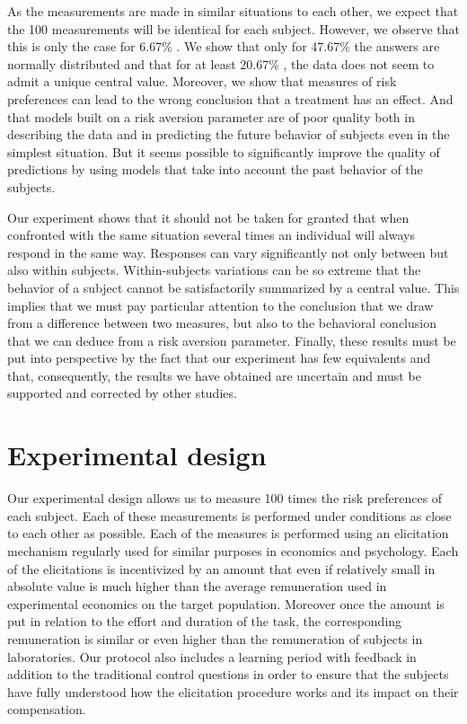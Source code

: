 \documentclass[
]{book}
\begin{document}
As the measurements are made in similar situations to each other, we
expect that the 100 measurements will be identical for each subject.
However, we observe that this is only the case for
6.67\% . We show that only for
47.67\% the answers are
normally distributed and that for at least
20.67\% , the data does
not seem to admit a unique central value. Moreover, we show that
measures of risk preferences can lead to the wrong conclusion that a
treatment has an effect.
And that models built on a risk aversion
parameter are of poor quality both in describing the data and in
predicting the future behavior of subjects even in the simplest
situation.
But it seems possible to significantly improve the quality of
predictions by using models that take into account the past behavior of
the subjects.

Our experiment shows that it should not be taken for granted that when
confronted with the same situation several times an individual will
always respond in the same way.
Responses can vary significantly not only between but also within subjects.
Within-subjects variations can be so extreme
that the behavior of a subject cannot be satisfactorily summarized
by a central value.
This implies that we must pay particular attention
to the conclusion that we draw from a difference between two measures,
but also to the behavioral conclusion that we can deduce from a risk
aversion parameter.
Finally, these results must be put into perspective
by the fact that our experiment has few equivalents and that,
consequently, the results we have obtained are uncertain and must be
supported and corrected by other studies.

\hypertarget{mm4}{%
\section{Experimental design}\label{mm4}}

Our experimental design allows us to measure 100 times the risk
preferences of each subject. Each of these measurements is performed
under conditions as close to each other as possible. Each of the
measures is performed using an elicitation mechanism regularly used for
similar purposes in economics and psychology. Each of the elicitations
is incentivized by an amount that even if relatively small in absolute
value is much higher than the average remuneration used in experimental
economics on the target population. Moreover once the amount is put in
relation to the effort and duration of the task, the corresponding
remuneration is similar or even higher than the remuneration of subjects
in laboratories. Our protocol also includes a learning period with
feedback in addition to the traditional control questions in order to
ensure that the subjects have fully understood how the elicitation
procedure works and its impact on their compensation.
\end{document}
